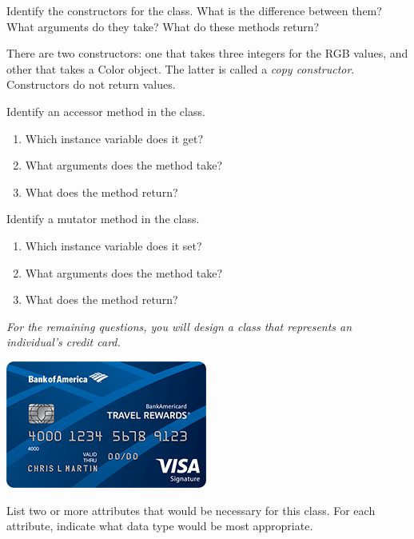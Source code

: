 

\Q Identify the constructors for the  class. What is the difference between them? What arguments do they take? What do these methods return?

\begin{answer}
There are two constructors: one that takes three integers for the RGB values, and other that takes a Color object. The latter is called a \emph{copy constructor}. Constructors do not return values.
\end{answer}


\Q Identify an accessor method in the  class. 
\begin{enumerate}[itemsep=1pt]
\item Which instance variable does it get? 
\item What arguments does the method take? 
\item What does the method return? 
\end{enumerate}


\Q Identify a mutator method in the  class.
\begin{enumerate}[itemsep=1pt]
\item Which instance variable does it set? 
\item What arguments does the method take? 
\item What does the method return? 
\end{enumerate}


\begin{center}
\textit{For the remaining questions, you will design a class that represents an individual's credit card.}
\bigskip\par
\includegraphics{CS1B/credit-card.png}
\end{center}


\Q List two or more attributes that would be necessary for this  class. For each attribute, indicate what data type would be most appropriate.

